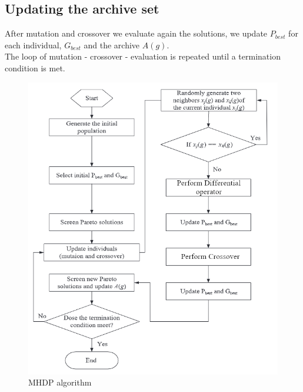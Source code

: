 \subsection{Updating the archive set}
After mutation and crossover we evaluate again the solutions, we update $P_{best}$ for each individual, $G_{best}$ and the archive $A(g)$.\\
The loop of mutation - crossover - evaluation is repeated until a termination condition is met.
\begin{figure}
    \includegraphics[width=\linewidth]{Images/mhdp_algo.png}
    \caption{MHDP algorithm}
    \label{fig:mhdp}
\end{figure}